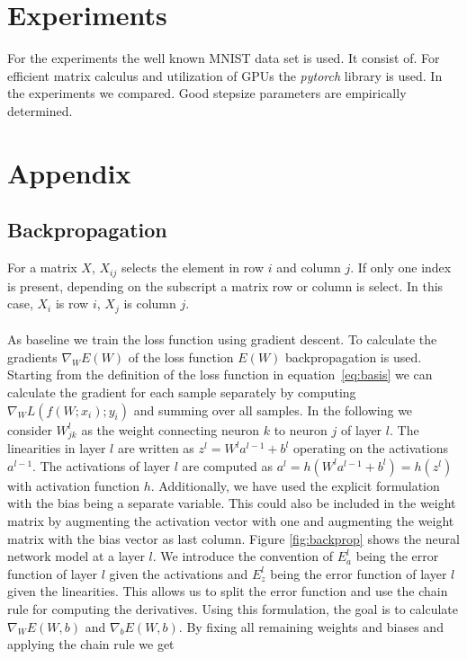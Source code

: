\documentclass[english,11pt,a4paper]{article}
\begin{document}
\section{Experiments}

For the experiments the well known MNIST data set is used. It consist of. For efficient matrix calculus and utilization of GPUs the \textit{pytorch} library is used. In the experiments we compared. Good stepsize parameters are empirically determined.


\newpage

\section{Appendix}

\subsection{Backpropagation}

For a matrix $X$, $X_{ij}$ selects the element in row $i$ and column $j$. If only one index is present, depending on the subscript a matrix row or column is select. In this case, $X_i$ is row $i$, $X_j$ is column $j$. \\ \\

As baseline we train the loss function using gradient descent. To calculate the gradients $\nabla_{W}E(W)$ of the loss function $E(W)$ backpropagation is used. Starting from the definition of the loss function in equation~\ref{eq:basis} we can calculate the gradient for each sample separately by computing $\nabla_{W}L(f(W;x_i);y_i)$ and summing over all samples. In the following we consider $W_{jk}^l$ as the weight connecting neuron $k$ to neuron $j$ of layer $l$. The linearities in layer $l$ are written as $z^l = W^la^{l-1} + b^l$ operating on the activations $a^{l-1}$. The activations of layer $l$ are computed as $a^l = h(W^l a^{l-1} + b^l) = h(z^l)$ with activation function $h$. Additionally, we have used the explicit formulation with the bias being a separate variable. This could also be included in the weight matrix by augmenting the activation vector with one and augmenting the weight matrix with the bias vector as last column. Figure \ref{fig:backprop} shows the neural network model at a layer $l$. We introduce the convention of $E^l_a$ being the error function of layer $l$ given the activations and $E^l_z$ being the error function of layer $l$ given the linearities. This allows us to split the error function and use the chain rule for computing the derivatives. Using this formulation, the goal is to calculate $\nabla_{W}E(W,b)$ and $\nabla_{b}E(W,b)$. By fixing all remaining weights and biases and applying the chain rule we get
\end{document}
